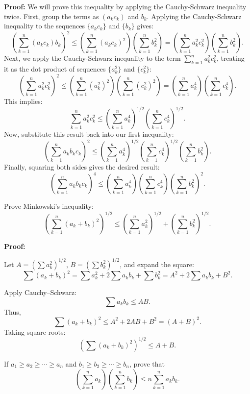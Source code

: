         \textbf{Proof:}
        We will prove this inequality by applying the Cauchy-Schwarz inequality twice.
        First, group the terms as $(a_k c_k)$ and $b_k$. Applying the Cauchy-Schwarz inequality to the sequences $\{a_k c_k\}$ and $\{b_k\}$ gives:
        \[
        \left( \sum_{k=1}^n (a_k c_k) b_k \right)^2 \leq \left( \sum_{k=1}^n (a_k c_k)^2 \right) \left( \sum_{k=1}^n b_k^2 \right) = \left( \sum_{k=1}^n a_k^2 c_k^2 \right) \left( \sum_{k=1}^n b_k^2 \right).
        \]
        Next, we apply the Cauchy-Schwarz inequality to the term $\sum_{k=1}^n a_k^2 c_k^2$, treating it as the dot product of sequences $\{a_k^2\}$ and $\{c_k^2\}$:
        \[
        \left( \sum_{k=1}^n a_k^2 c_k^2 \right)^2 \leq \left( \sum_{k=1}^n (a_k^2)^2 \right) \left( \sum_{k=1}^n (c_k^2)^2 \right) = \left( \sum_{k=1}^n a_k^4 \right) \left( \sum_{k=1}^n c_k^4 \right).
        \]
        This implies:
        \[
        \sum_{k=1}^n a_k^2 c_k^2 \leq \left( \sum_{k=1}^n a_k^4 \right)^{1/2} \left( \sum_{k=1}^n c_k^4 \right)^{1/2}.
        \]
        Now, substitute this result back into our first inequality:
        \[
        \left( \sum_{k=1}^n a_k b_k c_k \right)^2 \leq \left( \sum_{k=1}^n a_k^4 \right)^{1/2} \left( \sum_{k=1}^n c_k^4 \right)^{1/2} \left( \sum_{k=1}^n b_k^2 \right).
        \]
        Finally, squaring both sides gives the desired result:
        \[
        \left( \sum_{k=1}^n a_k b_k c_k \right)^4 \leq \left( \sum_{k=1}^n a_k^4 \right) \left( \sum_{k=1}^n c_k^4 \right) \left( \sum_{k=1}^n b_k^2 \right)^2.
        \]

\begin{problembox}
Prove Minkowski’s inequality:
\[
\left( \sum_{k=1}^n (a_k + b_k)^2 \right)^{1/2} \leq \left( \sum_{k=1}^n a_k^2 \right)^{1/2} + \left( \sum_{k=1}^n b_k^2 \right)^{1/2}.
\]
\end{problembox}

\textbf{Proof:}

Let \( A = \left( \sum a_k^2 \right)^{1/2} \), \( B = \left( \sum b_k^2 \right)^{1/2} \), and expand the square:
\[
\sum (a_k + b_k)^2 = \sum a_k^2 + 2\sum a_k b_k + \sum b_k^2 = A^2 + 2\sum a_k b_k + B^2.
\]

Apply Cauchy–Schwarz:
\[
\sum a_k b_k \leq A B.
\]
Thus,
\[
\sum (a_k + b_k)^2 \leq A^2 + 2AB + B^2 = (A + B)^2.
\]
Taking square roots:
\[
\left( \sum (a_k + b_k)^2 \right)^{1/2} \leq A + B.
\]


\begin{problembox}
    If \( a_1 \geq a_2 \geq \cdots \geq a_n \) and \( b_1 \geq b_2 \geq \cdots \geq b_n \), prove that
    \[
    \left( \sum_{k=1}^n a_k \right)\left( \sum_{k=1}^n b_k \right) \leq n \sum_{k=1}^n a_k b_k.
    \]
    \end{problembox}
    
